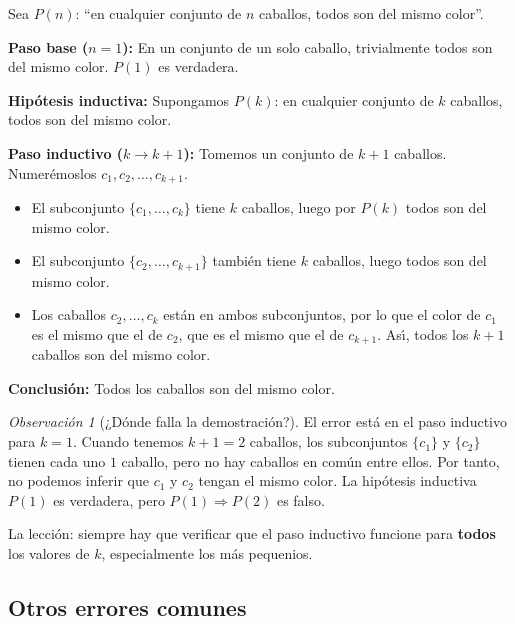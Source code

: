 \documentclass[11pt,a4paper]{article}
\theoremstyle{definition}
\theoremstyle{plain}
\theoremstyle{definition}
\theoremstyle{definition}
\theoremstyle{remark}
\newtheorem{observacion}{Observaci\'on}[section]
\newcommand{\implica}{\Rightarrow}         %
\begin{document}
Sea $P(n)$: \enquote{en cualquier conjunto de $n$ caballos, todos son del mismo
color}.

\noindent\textbf{Paso base ($n=1$):} En un conjunto de un solo caballo,
trivialmente todos son del mismo color. $P(1)$ es verdadera.

\noindent\textbf{Hip\'otesis inductiva:} Supongamos $P(k)$: en cualquier
conjunto de $k$ caballos, todos son del mismo color.

\noindent\textbf{Paso inductivo ($k\to k+1$):} Tomemos un conjunto de $k+1$
caballos. Numer\'emoslos $c_1, c_2, \dots, c_{k+1}$.
\begin{itemize}
    \item El subconjunto $\{c_1, \dots, c_k\}$ tiene $k$ caballos, luego por
          $P(k)$ todos son del mismo color.
    \item El subconjunto $\{c_2, \dots, c_{k+1}\}$ tambi\'en tiene $k$ caballos,
          luego todos son del mismo color.
    \item Los caballos $c_2, \dots, c_k$ est\'an en ambos subconjuntos, por lo
          que el color de $c_1$ es el mismo que el de $c_2$, que es el mismo
          que el de $c_{k+1}$. As\'{\i}, todos los $k+1$ caballos son del mismo
          color.
\end{itemize}

\noindent\textbf{Conclusi\'on:} Todos los caballos son del mismo color.

\begin{observacion}[\texorpdfstring{¿D\'onde falla la demostraci\'on?}{Donde falla la demostracion}]
\label{obs:falla}
El error est\'a en el paso inductivo para $k=1$. Cuando tenemos $k+1 = 2$
caballos, los subconjuntos $\{c_1\}$ y $\{c_2\}$ tienen cada uno $1$ caballo,
pero no hay caballos en com\'un entre ellos. Por tanto, no podemos inferir que
$c_1$ y $c_2$ tengan el mismo color. La hip\'otesis inductiva $P(1)$ es
verdadera, pero $P(1) \implica P(2)$ es falso.

La lecci\'on: siempre hay que verificar que el paso inductivo funcione para
\textbf{todos} los valores de $k$, especialmente los m\'as pequenios.
\end{observacion}

\subsection*{Otros errores comunes}
\end{document}
